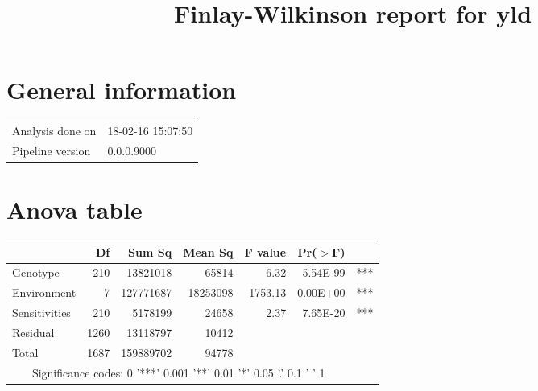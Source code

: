 \documentclass[a4paper,11pt]{article}\usepackage[]{graphicx}\usepackage[]{color}
\title{Finlay-Wilkinson report for yld}%
\author{\vspace{-5ex}}
\date{\vspace{-5ex}}
\begin{document}
\maketitle
\singlespacing

\section{General information}
\begin{table}[ht]
\begin{flushleft}
\begin{tabular}{ll}
  Analysis done on & 18-02-16 15:07:50 \\ 
  Pipeline version & 0.0.0.9000 \\ 
  \end{tabular}
\label{general}
\end{flushleft}
\end{table}


\section{Anova table}

\begin{table}[ht]
\begin{flushleft}
\begin{tabular}{lrrrrrl}
  \hline
 & Df & Sum Sq & Mean Sq & F value & Pr($>$F) &  \\ 
  \hline
Genotype & 210 & 13821018 & 65814 & 6.32 & 5.54E-99 & *** \\ 
  Environment & 7 & 127771687 & 18253098 & 1753.13 & 0.00E+00 & *** \\ 
  Sensitivities & 210 & 5178199 & 24658 & 2.37 & 7.65E-20 & *** \\ 
  Residual & 1260 & 13118797 & 10412 &  &  &  \\ 
  Total & 1687 & 159889702 & 94778 &  &  &  \\ 
   \hline  \multicolumn{6}{c}{Significance codes:  0 '***' 0.001 '**' 0.01 '*' 0.05 '.' 0.1 ' ' 1} \\ \hline
\end{tabular}
\label{anova}
\end{flushleft}
\end{table}
\end{document}
